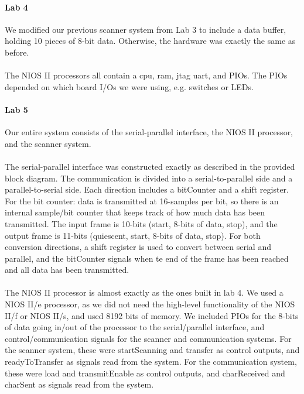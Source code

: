 \documentclass{article}
\begin{document}
    \paragraph{Lab 4} We modified our previous scanner system from Lab 3 to include a data buffer, holding 10 pieces of 8-bit data. Otherwise, the hardware was exactly the same as before.
    \paragraph{} The NIOS II processors all contain a cpu, ram, jtag uart, and PIOs. The PIOs depended on which board I/Os we were using, e.g. switches or LEDs.

    \paragraph{Lab 5} Our entire system consists of the serial-parallel interface, the NIOS II processor, and the scanner system.
    \paragraph{} The serial-parallel interface was constructed exactly as described in the provided block diagram. The communication is divided into a serial-to-parallel side and a parallel-to-serial side. Each direction includes a bitCounter and a shift register. For the bit counter: data is transmitted at 16-samples per bit, so there is an internal sample/bit counter that keeps track of how much data has been transmitted. The input frame is 10-bits (start, 8-bits of data, stop), and the output frame is 11-bits (quiescent, start, 8-bits of data, stop). For both conversion directions, a shift register is used to convert between serial and parallel, and the bitCounter signals when te end of the frame has been reached and all data has been transmitted.
    \paragraph{} The NIOS II processor is almost exactly as the ones built in lab 4. We used a NIOS II/e processor, as we did not need the high-level functionality of the NIOS II/f or NIOS II/s, and used 8192 bits of memory. We included PIOs for the 8-bits of data going in/out of the processor to the serial/parallel interface, and control/communication signals for the scanner and communication systems. For the scanner system, these were startScanning and transfer as control outputs, and readyToTransfer as signals read from the system. For the communication system, these were load and transmitEnable as control outputs, and charReceived and charSent as signals read from the system.
\end{document}

